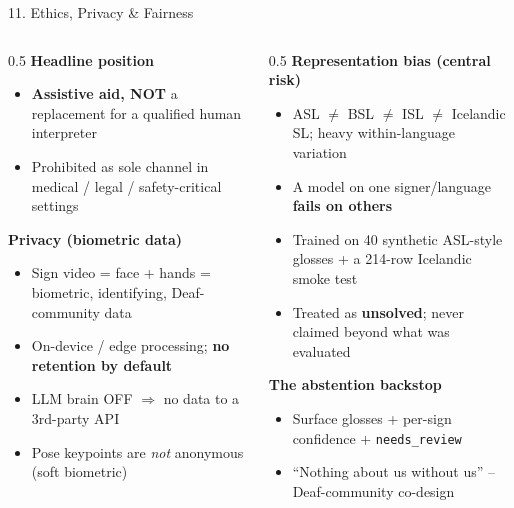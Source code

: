 \documentclass[10pt,aspectratio=169]{beamer}
\begin{document}
\begin{frame}{11. Ethics, Privacy \& Fairness}
\begin{columns}[T]
\begin{column}{0.5\textwidth}
\textbf{Headline position}
\begin{itemize}\small
  \item \textbf{Assistive aid, NOT} a replacement for a qualified human interpreter
  \item Prohibited as sole channel in medical / legal / safety-critical settings
\end{itemize}

\textbf{Privacy (biometric data)}
\begin{itemize}\small
  \item Sign video = face + hands = biometric, identifying, Deaf-community data
  \item On-device / edge processing; \textbf{no retention by default}
  \item LLM brain OFF $\Rightarrow$ no data to a 3rd-party API
  \item Pose keypoints are \emph{not} anonymous (soft biometric)
\end{itemize}
\end{column}
\begin{column}{0.5\textwidth}
\textbf{Representation bias (central risk)}
\begin{itemize}\small
  \item ASL $\neq$ BSL $\neq$ ISL $\neq$ Icelandic SL; heavy within-language variation
  \item A model on one signer/language \textbf{fails on others}
  \item Trained on 40 synthetic ASL-style glosses + a 214-row Icelandic smoke test
  \item Treated as \textbf{unsolved}; never claimed beyond what was evaluated
\end{itemize}

\textbf{The abstention backstop}
\begin{itemize}\small
  \item Surface glosses + per-sign confidence + \texttt{needs\_review}
  \item ``Nothing about us without us'' -- Deaf-community co-design
\end{itemize}
\end{column}
\end{columns}
\end{frame}
\end{document}
